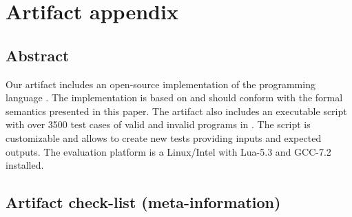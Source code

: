 \section{Artifact appendix}


\subsection{Abstract}

Our artifact includes an open-source implementation of the programming language
\CEU.
The implementation is based on and should conform with the formal semantics
presented in this paper.
The artifact also includes an executable script with over 3500 test cases of
valid and invalid programs in \CEU.
The script is customizable and allows to create new tests providing inputs and
expected outputs.
The evaluation platform is a Linux/Intel with Lua-5.3 and GCC-7.2 installed.

\subsection{Artifact check-list (meta-information)}

